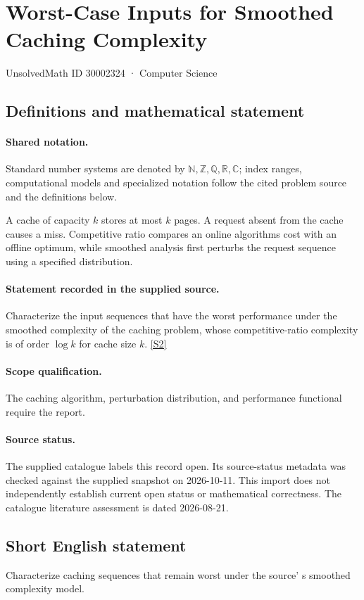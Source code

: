 \documentclass[11pt]{article}
\newcommand{\sref}[2]{\hyperlink{source:#1:#2}{[S#2]}}
\begin{document}
\setcounter{section}{30002323}
\section{Worst-Case Inputs for Smoothed Caching Complexity}\label{30002324}
{\small\sffamily UnsolvedMath ID 30002324 · Computer Science}
\subsection{Definitions and mathematical statement}

\paragraph{Shared notation.}Standard number systems are denoted by $\mathbb N,\mathbb Z,\mathbb Q,\mathbb R,\mathbb C$; index ranges, computational models and specialized notation follow the cited problem source and the definitions below.


A cache of capacity $k$ stores at most $k$ pages. A request absent from the cache causes a miss. Competitive ratio compares an online algorithm\textquotesingle s cost with an offline optimum, while smoothed analysis first perturbs the request sequence using a specified distribution.
\paragraph{Statement recorded in the supplied source.}
Characterize the input sequences that have the worst performance under the smoothed complexity of the caching problem, whose competitive-ratio complexity is of order $\log k$ for cache size $k$. \sref{30002324}{2}
\paragraph{Scope qualification.}
The caching algorithm, perturbation distribution, and performance functional require the report.
\paragraph{Source status.}
The supplied catalogue labels this record open. Its source-status metadata was checked against the supplied snapshot on 2026-10-11. This import does not independently establish current open status or mathematical correctness. The catalogue literature assessment is dated 2026-08-21.
\subsection{Short English statement}
Characterize caching sequences that remain worst under the source' s smoothed complexity model.
\end{document}
